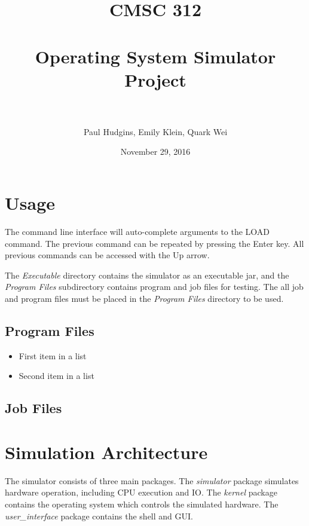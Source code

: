 \documentclass[paper=a4, fontsize=11pt]{scrartcl} %
\title{	
\normalfont \normalsize 
\textsc{CMSC 312} \\ [25pt] %
\horrule{0.5pt} \\[0.4cm] %
\huge Operating System Simulator Project \\ %
\horrule{2pt} \\[0.5cm] %
}
\author{Paul Hudgins, Emily Klein, Quark Wei} %
\date{\normalsize November 29, 2016}%
\numberwithin{equation}{section} %
\numberwithin{figure}{section} %
\numberwithin{table}{section} %
\begin{document}
\maketitle %


\section{Usage}

The command line interface will auto-complete arguments to the LOAD command. The previous command can be repeated by pressing the Enter key. All previous commands can be accessed with the Up arrow.


The \textit{Executable} directory contains the simulator as an executable jar, and the \textit{Program Files} subdirectory contains program and job files for testing. The all job and program files must be placed in the \textit{Program Files} directory to be used.

\subsection{Program Files}

\begin{itemize}
	\item First item in a list 
	\item Second item in a list 
\end{itemize}

\subsection{Job Files}


\section{Simulation Architecture}

The simulator consists of three main packages. The \textit{simulator} package simulates hardware operation, including CPU execution and IO. The \textit{kernel} package contains the operating system which controls the simulated hardware. The \textit{user\_interface} package contains the shell and GUI.
\end{document}
